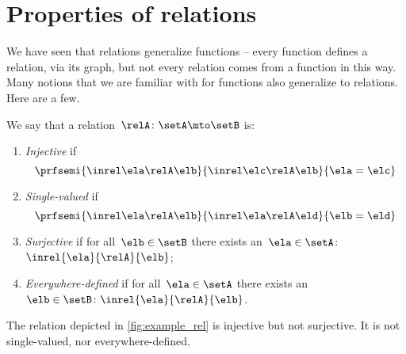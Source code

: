 
\section{Properties of relations}

We have seen that relations generalize functions -- every function defines a relation, via its graph, but not every relation comes from a function in this way.
Many notions that we are familiar with for functions also generalize to relations.
Here are a few.

\begin{ctdefinition}
    \label{def:rel_properties}
    We say that a relation~$\relA \colon \setA \mto \setB$ is:
    \begin{enumerate}
        \item \emph{Injective} if
              \begin{equation}
                  \prfsemi{
                      \inrel \ela \relA \elb
                  }{
                      \inrel \elc \relA \elb
                  }{
                      \ela=\elc
                  }
              \end{equation}
        \item \emph{Single-valued} if
              \begin{equation}
                  \prfsemi{
                      \inrel \ela \relA \elb
                  }{
                      \inrel \ela \relA \eld
                  }{
                      \elb = \eld
                  }
              \end{equation}
        \item \emph{Surjective} if for all~$\elb\in \setB$ there exists an~$\ela\in \setA$:~$\inrel{\ela}{\relA}{\elb}$;
        \item \emph{Everywhere-defined} if for all~$\ela\in \setA$ there exists an ~$\elb \in \setB\colon \inrel{\ela}{\relA}{\elb}$.
    \end{enumerate}
\end{ctdefinition}

\begin{example}
    The relation depicted in \cref{fig:example_rel} is injective but not surjective.
    It is not single-valued, nor everywhere-defined.
\end{example}

